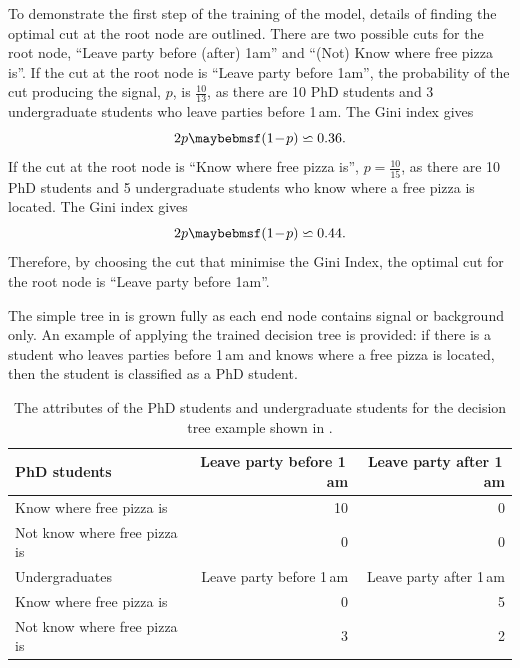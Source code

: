 To demonstrate the first step of the training of the model, details of finding the optimal cut at the root node are outlined. There are two possible cuts for the root node, ``Leave party before (after) 1am'' and ``(Not) Know where free pizza is''. If the cut at the root node is ``Leave party before 1am'', the probability of the cut producing the signal, $p$, is $\frac{10}{13}$, as there are 10 PhD students and 3 undergraduate students who leave parties before 1\,am. The Gini index gives
\begin{equation}
2p\parenths{1\!-\!p} \backsimeq 0.36 .
\end{equation}
If the cut at the root node is ``Know where free pizza is'', $p=\frac{10}{15}$, as there are  10 PhD students and 5 undergraduate students who know where a free pizza is located. The Gini index gives
\begin{equation}
2p\parenths{1\!-\!p} \backsimeq 0.44 .
\end{equation}
Therefore, by choosing the cut that minimise the Gini Index, the optimal cut for the root node is ``Leave party before 1am''.

The simple tree in  is grown fully as each end node contains signal or background only. An example of applying the trained decision tree is provided: if there is a student who leaves parties before 1\,am and knows where a free pizza is located, then the student is classified as a PhD student.



\begin{table}[!htbp]\centering

\begin{tabular}{lrr}
\hline \hline
PhD students & Leave party before 1\,am  & Leave party after 1\,am\\
\hline
Know where free pizza is & 10 & 0 \\
Not know where free pizza is & 0 & 0 \\
\hline
Undergraduates & Leave party before 1\,am  & Leave party after 1\,am\\
\hline
Know where free pizza is & 0 & 5 \\
Not know where free pizza is & 3 & 2 \\
\hline \hline
\end{tabular}
\caption
{The attributes of  the PhD students and undergraduate students for the decision tree example shown in .}
\label{tab:doubleHiggsDecisionTreeComic2}
\end{table}

